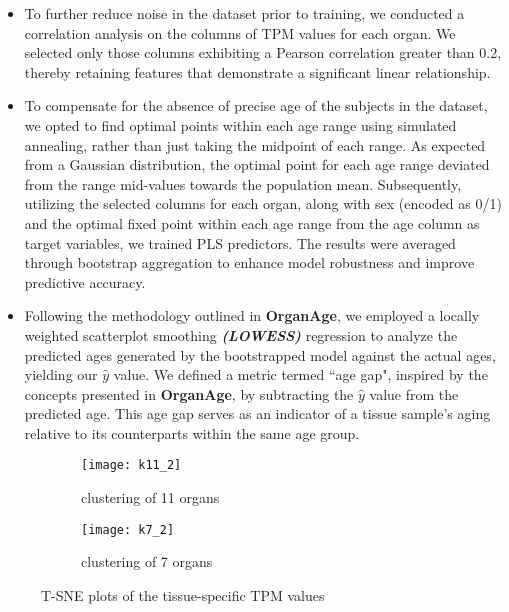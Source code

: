 \documentclass[twocolumn]{article}
\begin{document}
\begin{itemize}
    \item To further reduce noise in the dataset prior to training, we conducted a correlation analysis on the columns of TPM values for each organ. We selected only those columns exhibiting a Pearson correlation greater than 0.2, thereby retaining features that demonstrate a significant linear relationship.

    \item To compensate for the absence of precise age of the subjects in the dataset, we opted to find optimal points within each age range using simulated annealing, rather than just taking the midpoint of each range. As expected from a Gaussian distribution, the optimal point for each age range deviated from the range mid-values towards the population mean. Subsequently, utilizing the selected columns for each organ, along with sex (encoded as 0/1) and the optimal fixed point within each age range from the age column as target variables, we trained PLS predictors. The results were averaged through bootstrap aggregation to enhance model robustness and improve predictive accuracy.

    \item Following the methodology outlined in
    \textbf{OrganAge}, we employed a locally weighted scatterplot smoothing \textbf{\textit{(LOWESS)}} regression to analyze the predicted ages generated by the bootstrapped model against the actual ages, yielding our \(\hat{y}\) value. We defined a metric termed ``age gap", inspired by the concepts presented in \textbf{OrganAge}, by subtracting the \(\hat{y}\) value from the predicted age. This age gap serves as an indicator of a tissue sample's aging relative to its counterparts within the same age group.
\end{itemize}


\begin{figure}[H]
    \centering
    \begin{subfigure}{\linewidth}
        \texttt{[image: k11\_2]}
        \caption{clustering of 11 organs}
        \label{fig:k11}
    \end{subfigure}

    \vspace{1em}

    \begin{subfigure}{\linewidth}
        \texttt{[image: k7\_2]}
        \caption{clustering of 7 organs}
        \label{fig:k7}
    \end{subfigure}

    \caption{T-SNE plots of the tissue-specific TPM values}
    \label{fig:t-SNE plots of the tissue-specific TPM values}
\end{figure}
\end{document}
